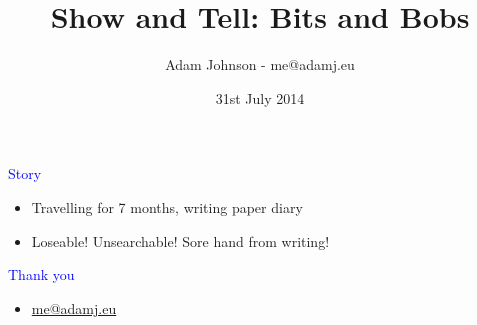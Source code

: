 \documentclass[landscape]{slides}
\title{Show and Tell: Bits and Bobs}
\author{Adam Johnson - me@adamj.eu}
\date{31st July 2014}
\begin{document}
\maketitle

\begin{slide}

    \textcolor{blue}{\Large{Story}}

    \begin{itemize}
        \item Travelling for 7 months, writing paper diary
    \end{itemize}


    \begin{itemize}
        \item Loseable! Unsearchable! Sore hand from writing!
    \end{itemize}

\end{slide}

\begin{slide}
    \textcolor{blue}{\Large{Thank you}}

    \begin{itemize}
        \item \url{me@adamj.eu}
    \end{itemize}

\end{slide}
\end{document}
